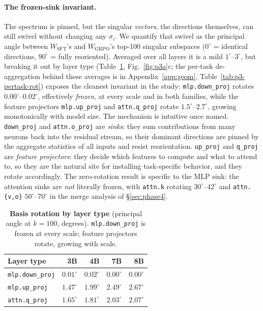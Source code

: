 \documentclass{article}
\newcommand{\Wsft}{W_{\mathrm{SFT}}}
\newcommand{\Wg}{W_{\mathrm{GRPO}}}
\newcommand{\dg}{^{\circ}}
\begin{document}
\paragraph{The frozen-sink invariant.} The spectrum is pinned, but the singular \emph{vectors}, the directions themselves, can still swivel without changing any $\sigma_i$. We quantify that
swivel as the principal angle between $\Wsft$'s and $\Wg$'s top-100 singular subspaces ($0\dg$ =
identical directions, $90\dg$ = fully reoriented). Averaged over all layers it is a mild
$1\dg$--$3\dg$, but breaking it out by layer type (Table~\ref{tab:p3-rot}, Fig.~\ref{fig:p3a}c; the
per-task de-aggregation behind these averages is in Appendix~\ref{app:geom},
Table~\ref{tab:p3-pertask-rot})
exposes the cleanest invariant in the study: \texttt{mlp.down\_proj} rotates $0.00\dg$--$0.02\dg$, effectively \emph{frozen}, at every scale and in both families, while the feature projectors
\texttt{mlp.up\_proj} and \texttt{attn.q\_proj} rotate $1.5\dg$--$2.7\dg$, growing monotonically
with model size. The mechanism is intuitive once named. \texttt{down\_proj} and \texttt{attn.o\_proj}
are \emph{sinks}: they sum contributions from many neurons back into the residual stream, so their
dominant directions are pinned by the aggregate statistics of all inputs and resist reorientation.
\texttt{up\_proj} and \texttt{q\_proj} are \emph{feature projectors}: they decide which features to
compute and what to attend to, so they are the natural site for installing task-specific behavior,
and they rotate accordingly. The zero-rotation result is specific to the MLP sink: the attention
sinks are \emph{not} literally frozen, with \texttt{attn.k} rotating $30\dg$--$42\dg$ and
\texttt{attn.\{v,o\}} $50\dg$--$70\dg$ in the merge analysis of \S\ref{sec:phase4}.

\begin{table}[t]
\centering\small
\caption{\textbf{Basis rotation by layer type} (principal angle at $k{=}100$, degrees).
\texttt{mlp.down\_proj} is frozen at every scale; feature projectors rotate, growing with scale.}
\label{tab:p3-rot}
\begin{tabular}{lrrrr}
\toprule
Layer type & 3B & 4B & 7B & 8B\\
\midrule
\texttt{mlp.down\_proj} & $0.01\dg$ & $0.02\dg$ & $0.00\dg$ & $0.00\dg$\\
\texttt{mlp.up\_proj}   & $1.47\dg$ & $1.99\dg$ & $2.49\dg$ & $2.67\dg$\\
\texttt{attn.q\_proj}   & $1.65\dg$ & $1.81\dg$ & $2.03\dg$ & $2.07\dg$\\
\bottomrule
\end{tabular}
\end{table}
\end{document}
